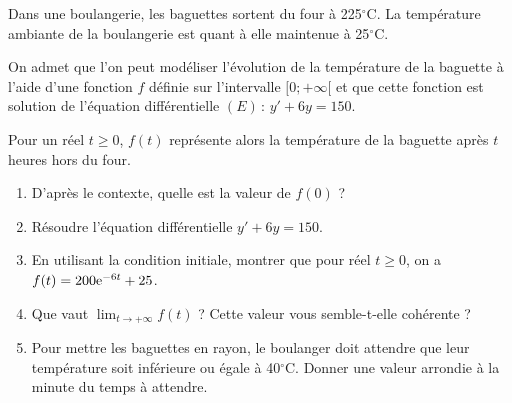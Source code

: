 \documentclass[11pt,fleqn, openany]{book} %
\begin{document}
\begin{exercise}[topic=diff03]
Dans une boulangerie, les baguettes sortent du four à 225$^{\circ}$C. La température ambiante de la boulangerie est quant à elle maintenue à 25$^{\circ}$C. 

On admet que l'on peut modéliser l'évolution de la température de la baguette à l'aide d'une fonction $f$ définie sur l'intervalle $[0;+\infty[$ et que cette fonction est solution de l'équation différentielle $(E)\, : \, y'+6y=150$.

Pour un réel $t\geqslant 0$, $f(t)$ représente alors la température de la baguette après $t$ heures hors du four.
\begin{enumerate}
\item D'après le contexte, quelle est la valeur de $f(0)$ ?
\item Résoudre l'équation différentielle $y'+6y=150$.
\item En utilisant la condition initiale, montrer que pour réel $t \geqslant 0$, on a $f(t)=200\mathrm{e}^{-6t}+25$.
\item Que vaut $\displaystyle\lim_{t \to + \infty}f(t)$ ? Cette valeur vous semble-t-elle cohérente ?
\item Pour mettre les baguettes en rayon, le boulanger doit attendre que leur température soit inférieure ou égale à 40$^{\circ}$C. Donner une valeur arrondie à la minute du temps à attendre. 
\end{enumerate}\end{exercise}
\end{document}
